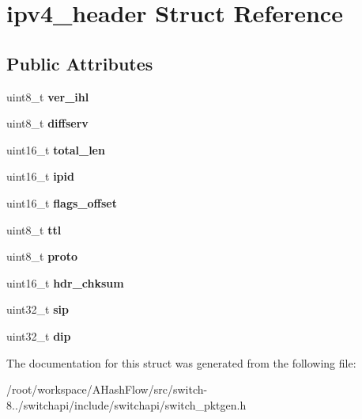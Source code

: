 \hypertarget{structipv4__header}{\section{ipv4\+\_\+header Struct Reference}
\label{structipv4__header}
}
\subsection*{Public Attributes}
\begin{DoxyCompactItemize}
\item 
\hypertarget{structipv4__header_a517dfc443e8cd67f4d9619d6ae94cfad}{uint8\+\_\+t {\bfseries ver\+\_\+ihl}}\label{structipv4__header_a517dfc443e8cd67f4d9619d6ae94cfad}

\item 
\hypertarget{structipv4__header_aff3f6b7610382a238ab386a70a50dd27}{uint8\+\_\+t {\bfseries diffserv}}\label{structipv4__header_aff3f6b7610382a238ab386a70a50dd27}

\item 
\hypertarget{structipv4__header_a0fb748071a24c7483e437abd99aedbce}{uint16\+\_\+t {\bfseries total\+\_\+len}}\label{structipv4__header_a0fb748071a24c7483e437abd99aedbce}

\item 
\hypertarget{structipv4__header_a0073c36423af6beb2b2752b2a57fec9a}{uint16\+\_\+t {\bfseries ipid}}\label{structipv4__header_a0073c36423af6beb2b2752b2a57fec9a}

\item 
\hypertarget{structipv4__header_ab3a8e00a465316096a0ce970408aba97}{uint16\+\_\+t {\bfseries flags\+\_\+offset}}\label{structipv4__header_ab3a8e00a465316096a0ce970408aba97}

\item 
\hypertarget{structipv4__header_a847be1c747cb3282ac66c766a176ecfd}{uint8\+\_\+t {\bfseries ttl}}\label{structipv4__header_a847be1c747cb3282ac66c766a176ecfd}

\item 
\hypertarget{structipv4__header_a4845409952fa7b9cc3a89a166e873cde}{uint8\+\_\+t {\bfseries proto}}\label{structipv4__header_a4845409952fa7b9cc3a89a166e873cde}

\item 
\hypertarget{structipv4__header_adbd1f3d7012037f220ce1e2d51ba27a3}{uint16\+\_\+t {\bfseries hdr\+\_\+chksum}}\label{structipv4__header_adbd1f3d7012037f220ce1e2d51ba27a3}

\item 
\hypertarget{structipv4__header_a8227672b5c741be1d8cb84dfa3ab5f6a}{uint32\+\_\+t {\bfseries sip}}\label{structipv4__header_a8227672b5c741be1d8cb84dfa3ab5f6a}

\item 
\hypertarget{structipv4__header_ae275c482da9108e8dc187284bbbe34d8}{uint32\+\_\+t {\bfseries dip}}\label{structipv4__header_ae275c482da9108e8dc187284bbbe34d8}

\end{DoxyCompactItemize}


The documentation for this struct was generated from the following file\+:\begin{DoxyCompactItemize}
\item 
/root/workspace/\+A\+Hash\+Flow/src/switch-\/8../switchapi/include/switchapi/switch\+\_\+pktgen.\+h\end{DoxyCompactItemize}
